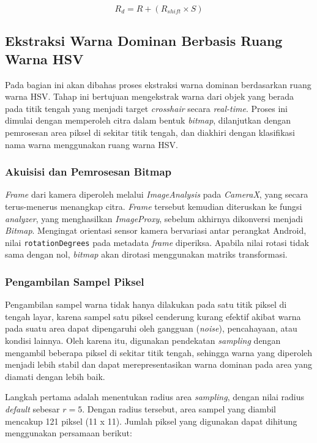 \begin{equation}
R_{d} = R + (R_{shift} \times S)
\end{equation}

\subsection{Ekstraksi Warna Dominan Berbasis Ruang Warna HSV}

Pada bagian ini akan dibahas proses ekstraksi warna dominan berdasarkan ruang warna HSV. Tahap ini bertujuan mengekstrak warna dari objek yang berada pada titik tengah yang menjadi target \textit{crosshair} secara \textit{real-time}. Proses ini dimulai dengan memperoleh citra dalam bentuk \textit{bitmap}, dilanjutkan dengan pemrosesan area piksel di sekitar titik tengah, dan diakhiri dengan klasifikasi nama warna menggunakan ruang warna HSV.

\subsubsection{Akuisisi dan Pemrosesan Bitmap}

\textit{Frame} dari kamera diperoleh melalui \textit{ImageAnalysis} pada \textit{CameraX}, yang secara terus-menerus menangkap citra. \textit{Frame} tersebut kemudian diteruskan ke fungsi \textit{analyzer}, yang menghasilkan \textit{ImageProxy}, sebelum akhirnya dikonversi menjadi \textit{Bitmap}. Mengingat orientasi sensor kamera bervariasi antar perangkat Android, nilai \texttt{rotationDegrees} pada metadata \textit{frame} diperiksa. Apabila nilai rotasi tidak sama dengan nol, \textit{bitmap} akan dirotasi menggunakan matriks transformasi.

\subsubsection{Pengambilan Sampel Piksel}

Pengambilan sampel warna tidak hanya dilakukan pada satu titik piksel di tengah layar, karena sampel satu piksel cenderung kurang efektif akibat warna pada suatu area dapat dipengaruhi oleh gangguan (\textit{noise}), pencahayaan, atau kondisi lainnya. Oleh karena itu, digunakan pendekatan \textit{sampling} dengan mengambil beberapa piksel di sekitar titik tengah, sehingga warna yang diperoleh menjadi lebih stabil dan dapat merepresentasikan warna dominan pada area yang diamati dengan lebih baik.

Langkah pertama adalah menentukan radius area \textit{sampling}, dengan nilai radius \textit{default} sebesar $r=5$. Dengan radius tersebut, area sampel yang diambil mencakup 121 piksel (11 x 11). Jumlah piksel yang digunakan dapat dihitung menggunakan persamaan berikut:


